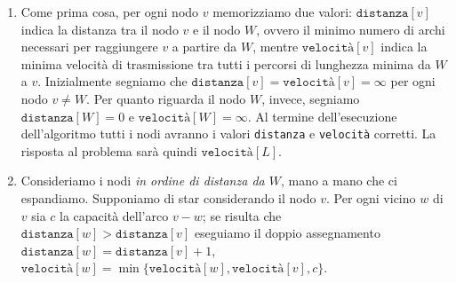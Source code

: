 \begin{enumerate}[nolistsep, itemsep=2mm, leftmargin=.8cm]
	\item Come prima cosa, per ogni nodo $v$ memorizziamo due valori: $\texttt{distanza}[v]$ indica la distanza tra il nodo $v$ e il nodo $W$, ovvero il minimo numero di archi necessari per raggiungere $v$ a partire da $W$, mentre $\texttt{velocità}[v]$ indica la minima velocità di trasmissione tra tutti i percorsi di lunghezza minima da $W$ a $v$. Inizialmente segniamo che $\texttt{distanza}[v] = \texttt{velocità}[v] = \infty$ per ogni nodo $v \neq W$. Per quanto riguarda il nodo $W$, invece, segniamo $\texttt{distanza}[W] = 0$ e 
	$\texttt{velocità}[W] = \infty$. Al termine dell'esecuzione dell'algoritmo tutti i nodi avranno i valori \texttt{distanza} e \texttt{velocità} corretti. La risposta al problema sarà quindi $\texttt{velocità}[L]$.
	
	\item Consideriamo i nodi \emph{in ordine di distanza da $W$}, mano a mano che ci espandiamo. Supponiamo di star considerando il nodo $v$. Per ogni vicino $w$ di $v$ sia $c$ la capacità dell'arco $v - w$; se risulta che $\texttt{distanza}[w] > \texttt{distanza}[v]$ eseguiamo il doppio assegnamento $\texttt{distanza}[w] = \texttt{distanza}[v] + 1$, $\texttt{velocità}[w] = \min\{\texttt{velocità}[w], \texttt{velocità}[v], c\}$.
\end{enumerate}
\vfill
\captionsetup[subfigure]{labelformat=empty}
